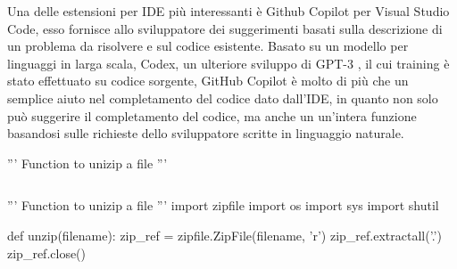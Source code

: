 Una delle estensioni per IDE più interessanti è Github Copilot per Visual Studio Code, esso fornisce allo sviluppatore dei suggerimenti basati sulla descrizione di un problema da risolvere e sul codice esistente. Basato su un modello per linguaggi in larga scala, Codex, un ulteriore sviluppo di GPT-3 \cite{brown2020language}, il cui training è stato effettuato su codice sorgente, GitHub Copilot è molto di più che un semplice aiuto nel completamento del codice dato dall'IDE, in quanto non solo può suggerire il completamento del codice, ma anche un un'intera funzione basandosi sulle richieste dello sviluppatore scritte in linguaggio naturale. \cite{sobania2021choose}
\bigbreak
\begin{python}
'''
Function to unizip a file
'''
\end{python}
\begin{lstlisting}[frame=none,caption={Commento scritto dallo sviluppatore},captionpos=b,label=copilotinput]
\end{lstlisting}
\begin{python}
'''
Function to unizip a file
'''
import zipfile
import os
import sys
import shutil

def unzip(filename):
    zip_ref = zipfile.ZipFile(filename, 'r')
    zip_ref.extractall('.')
    zip_ref.close()
\end{python}
\begin{lstlisting}[frame=none,caption={Codice generato da GitHub Copilot},captionpos=b,label=copilotoutput]
\end{lstlisting}
\newpage
